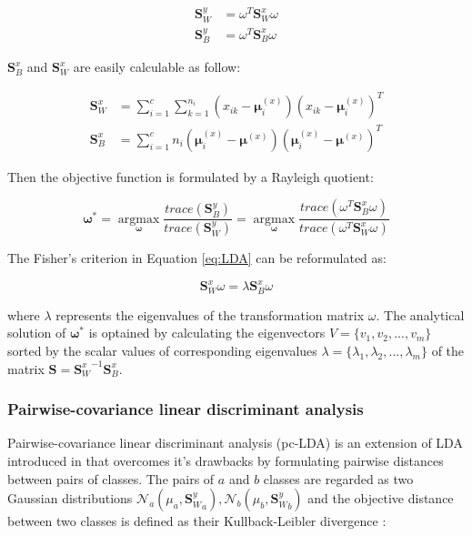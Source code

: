         \begin{align}
            \boldsymbol{S}_W^y &= \omega^T\boldsymbol{S}_W^x\omega\\
            \boldsymbol{S}_B^y &= \omega^T\boldsymbol{S}_B^x\omega
        \end{align}

        $\boldsymbol{S}_B^x$ and $\boldsymbol{S}_W^x$ are easily calculable as follow:

        \begin{align}
            \boldsymbol{S}_W^x &= \sum_{i=1}^{c}\sum_{k=1}^{n_{i}}(x_{ik}-\boldsymbol{\mu}_i^{(x)})(x_{ik}-\boldsymbol{\mu}_i^{(x)})^T \label{eq:LDA_Sw_x}\\
            \boldsymbol{S}_B^x &= \sum_{i=1}^{c}n_i(\boldsymbol{\mu}_i^{(x)} - \boldsymbol{\mu}^{(x)})(\boldsymbol{\mu}_i^{(x)} - \boldsymbol{\mu}^{(x)})^T \label{eq:LDA_Sb_x}
        \end{align}

        Then the objective function is formulated by a Rayleigh quotient:

        \begin{equation}
            \boldsymbol{\omega}^* = \operatorname*{argmax}_{\boldsymbol{\omega}}\frac{trace(\boldsymbol{S}_B^y)}{trace(\boldsymbol{S}_W^y)} = \operatorname*{argmax}_{\boldsymbol{\omega}}\frac{trace(\omega^T\boldsymbol{S}_B^x\omega)}{trace(\omega^T\boldsymbol{S}_W^x\omega)}
            \label{eq:LDA}
        \end{equation}

        The Fisher's criterion in Equation \eqref{eq:LDA} can be reformulated as:

        \begin{equation}
            \boldsymbol{S}_W^x\omega = \lambda\boldsymbol{S}_B^x\omega
        \end{equation}

        where $\lambda$ represents the eigenvalues of the transformation matrix $\omega$. The analytical solution of $\boldsymbol{\omega}^*$ is optained by calculating the eigenvectors $V = \{v_1,v_2,...,v_m\}$ sorted by the scalar values of corresponding eigenvalues $\lambda = \{\lambda_1,\lambda_2,...,\lambda_m\}$ of the matrix $\boldsymbol{S} = {\boldsymbol{S}_W^x}^{-1}\boldsymbol{S}_B^x$.

    \subsubsection{Pairwise-covariance linear discriminant analysis}
        Pairwise-covariance linear discriminant analysis (pc-LDA) is an extension of LDA introduced in \cite{kong2014pairwise} that overcomes it's drawbacks by formulating pairwise distances between pairs of classes.
        The pairs of $a$ and $b$ classes are regarded as two Gaussian distributions $\mathcal{N}_a(\mu_a,{\boldsymbol{S}_W^y}_a), \mathcal{N}_b(\mu_b,{\boldsymbol{S}_W^y}_b)$ and the objective distance between two classes is defined as their Kullback-Leibler divergence \cite{kullback1951}:

